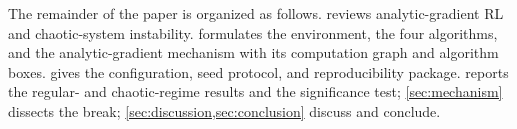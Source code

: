 The remainder of the paper is organized as follows. 
reviews analytic-gradient RL and chaotic-system instability.
 formulates the environment, the four algorithms, and the
analytic-gradient mechanism with its computation graph and algorithm boxes.
 gives the configuration, seed protocol, and reproducibility
package.  reports the regular- and chaotic-regime results
and the significance test; \cref{sec:mechanism} dissects the break;
\cref{sec:discussion,sec:conclusion} discuss and conclude.
